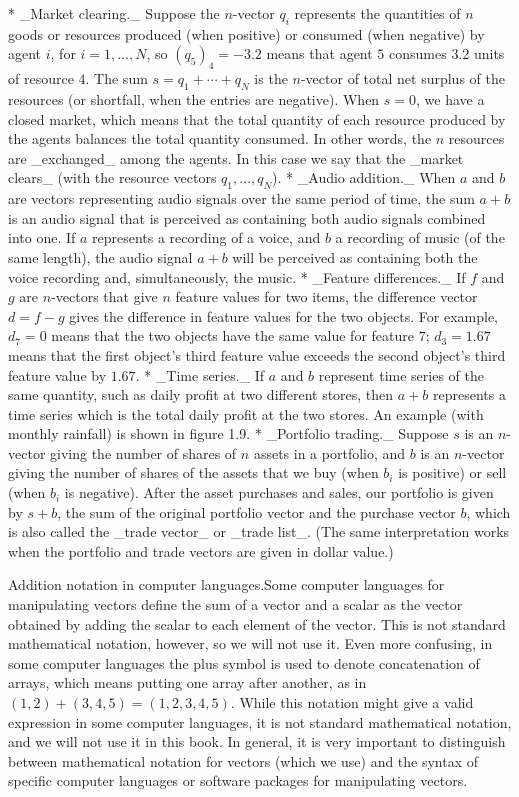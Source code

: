 * _Market clearing._ Suppose the \(n\)-vector \(q_{i}\) represents the quantities of \(n\) goods or resources produced (when positive) or consumed (when negative) by agent \(i\), for \(i=1,\ldots,N\), so \((q_{5})_{4}=-3.2\) means that agent \(5\) consumes \(3.2\) units of resource \(4\). The sum \(s=q_{1}+\cdots+q_{N}\) is the \(n\)-vector of total net surplus of the resources (or shortfall, when the entries are negative). When \(s=0\), we have a closed market, which means that the total quantity of each resource produced by the agents balances the total quantity consumed. In other words, the \(n\) resources are _exchanged_ among the agents. In this case we say that the _market clears_ (with the resource vectors \(q_{1},\ldots,q_{N}\)).
* _Audio addition._ When \(a\) and \(b\) are vectors representing audio signals over the same period of time, the sum \(a+b\) is an audio signal that is perceived as containing both audio signals combined into one. If \(a\) represents a recording of a voice, and \(b\) a recording of music (of the same length), the audio signal \(a+b\) will be perceived as containing both the voice recording and, simultaneously, the music.
* _Feature differences._ If \(f\) and \(g\) are \(n\)-vectors that give \(n\) feature values for two items, the difference vector \(d=f-g\) gives the difference in feature values for the two objects. For example, \(d_{7}=0\) means that the two objects have the same value for feature \(7\); \(d_{3}=1.67\) means that the first object's third feature value exceeds the second object's third feature value by \(1.67\).
* _Time series._ If \(a\) and \(b\) represent time series of the same quantity, such as daily profit at two different stores, then \(a+b\) represents a time series which is the total daily profit at the two stores. An example (with monthly rainfall) is shown in figure 1.9.
* _Portfolio trading._ Suppose \(s\) is an \(n\)-vector giving the number of shares of \(n\) assets in a portfolio, and \(b\) is an \(n\)-vector giving the number of shares of the assets that we buy (when \(b_{i}\) is positive) or sell (when \(b_{i}\) is negative). After the asset purchases and sales, our portfolio is given by \(s+b\), the sum of the original portfolio vector and the purchase vector \(b\), which is also called the _trade vector_ or _trade list_. (The same interpretation works when the portfolio and trade vectors are given in dollar value.)

Addition notation in computer languages.Some computer languages for manipulating vectors define the sum of a vector and a scalar as the vector obtained by adding the scalar to each element of the vector. This is not standard mathematical notation, however, so we will not use it. Even more confusing, in some computer languages the plus symbol is used to denote concatenation of arrays, which means putting one array after another, as in \((1,2)+(3,4,5)=(1,2,3,4,5)\). While this notation might give a valid expression in some computer languages, it is not standard mathematical notation, and we will not use it in this book. In general, it is very important to distinguish between mathematical notation for vectors (which we use) and the syntax of specific computer languages or software packages for manipulating vectors.

 